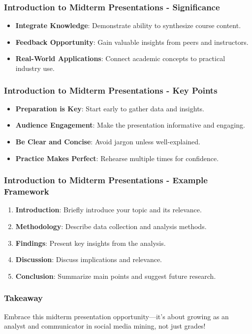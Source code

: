 \documentclass{beamer}
\begin{document}
\begin{frame}[fragile]
    \frametitle{Introduction to Midterm Presentations - Significance}
    \begin{itemize}
        \item \textbf{Integrate Knowledge}: Demonstrate ability to synthesize course content.
        \item \textbf{Feedback Opportunity}: Gain valuable insights from peers and instructors.
        \item \textbf{Real-World Applications}: Connect academic concepts to practical industry use.
    \end{itemize}
\end{frame}

\begin{frame}[fragile]
    \frametitle{Introduction to Midterm Presentations - Key Points}
    \begin{itemize}
        \item \textbf{Preparation is Key}: Start early to gather data and insights.
        \item \textbf{Audience Engagement}: Make the presentation informative and engaging.
        \item \textbf{Be Clear and Concise}: Avoid jargon unless well-explained.
        \item \textbf{Practice Makes Perfect}: Rehearse multiple times for confidence.
    \end{itemize}
\end{frame}

\begin{frame}[fragile]
    \frametitle{Introduction to Midterm Presentations - Example Framework}
    \begin{enumerate}
        \item \textbf{Introduction}: Briefly introduce your topic and its relevance.
        \item \textbf{Methodology}: Describe data collection and analysis methods.
        \item \textbf{Findings}: Present key insights from the analysis.
        \item \textbf{Discussion}: Discuss implications and relevance.
        \item \textbf{Conclusion}: Summarize main points and suggest future research.
    \end{enumerate}
\end{frame}

\begin{frame}[fragile]
    \frametitle{Takeaway}
    Embrace this midterm presentation opportunity—it's about growing as an analyst and communicator in social media mining, not just grades!
\end{frame}
\end{document}
